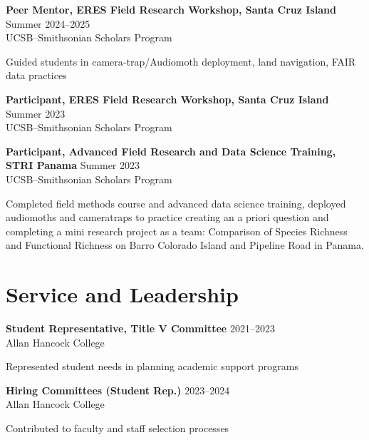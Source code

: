 \documentclass[letterpaper]{article}
\renewenvironment{itemize}{
  \begin{list}{}{
    \setlength{\leftmargin}{1.5em}
  }
}{
  \end{list}
}
\begin{document}
\begin{itemize}
  \item \textbf{Peer Mentor, ERES Field Research Workshop, Santa Cruz Island} \hfill Summer 2024--2025 \\
    UCSB–Smithsonian Scholars Program  
    \begin{itemize}
      \item Guided students in camera‐trap/Audiomoth deployment, land navigation, FAIR data practices
      \item 
    \end{itemize}
    
  \item \textbf{Participant, ERES Field Research Workshop, Santa Cruz Island} \hfill Summer 2023 \\
    UCSB–Smithsonian Scholars Program  
    \begin{itemize}

  \item \textbf{Participant, Advanced Field Research and Data Science Training, STRI Panama} \hfill Summer 2023 \\
    UCSB–Smithsonian Scholars Program   
    \begin{itemize}
      \item Completed field methods course and advanced data science training, deployed audiomoths and cameratraps to practice creating an a priori question and completing a mini research project as a team: Comparison of Species Richness and Functional Richness on Barro Colorado Island and Pipeline Road in Panama.
    \end{itemize}
\end{itemize}

\section*{Service and Leadership}

\begin{itemize}
  \item \textbf{Student Representative, Title V Committee} \hfill 2021--2023 \\
    Allan Hancock College  
    \item Represented student needs in planning academic support programs

  \item \textbf{Hiring Committees (Student Rep.)} \hfill 2023--2024 \\
    Allan Hancock College  
    \item Contributed to faculty and staff selection processes


\end{itemize}
\end{itemize}
\end{document}

